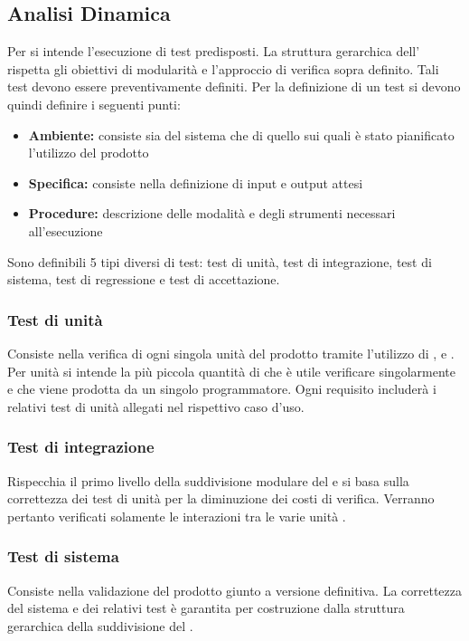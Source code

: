 \documentclass[12pt,a4paper]{article}
\begin{document}
\subsection{Analisi Dinamica} 
Per  si intende l'esecuzione di test predisposti. La struttura gerarchica dell' rispetta gli obiettivi di modularità e l'approccio di verifica  sopra definito. Tali test devono essere preventivamente definiti. Per la definizione di un test si devono quindi definire i seguenti punti:

\begin{itemize}
	\item \textbf{Ambiente:} consiste sia del sistema  che di quello  sui quali è stato pianificato l'utilizzo del prodotto
	\item \textbf{Specifica:} consiste nella definizione di input e output attesi
	\item \textbf{Procedure:} descrizione delle modalità e degli strumenti necessari all'esecuzione
\end{itemize}

Sono definibili 5 tipi diversi di test: test di unità, test di integrazione, test di sistema, test di regressione e test di accettazione.

\subsubsection{Test di unità}
Consiste nella verifica di ogni singola unità del prodotto  tramite l'utilizzo di ,  e . Per unità si intende la più piccola quantità di  che è utile verificare singolarmente e che viene prodotta da un singolo programmatore. Ogni requisito includerà i relativi test di unità allegati nel rispettivo caso d'uso.

\subsubsection{Test di integrazione}
Rispecchia il primo livello della suddivisione modulare del  e si basa sulla correttezza dei test di unità per la diminuzione dei costi di verifica. Verranno pertanto verificati solamente le interazioni tra le varie unità .

\subsubsection{Test di sistema}
Consiste nella validazione del prodotto giunto a versione definitiva. La correttezza del sistema e dei relativi test è garantita per costruzione dalla struttura gerarchica della suddivisione del .
\end{document}
